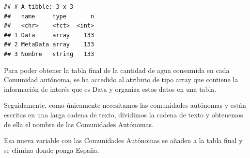 \documentclass[
]{article}
\newenvironment{Shaded}{\begin{snugshade}}{\end{snugshade}}
\newcommand{\ControlFlowTok}[1]{\textcolor[rgb]{0.13,0.29,0.53}{\textbf{#1}}}
\newcommand{\DecValTok}[1]{\textcolor[rgb]{0.00,0.00,0.81}{#1}}
\newcommand{\FunctionTok}[1]{\textcolor[rgb]{0.13,0.29,0.53}{\textbf{#1}}}
\newcommand{\NormalTok}[1]{#1}
\newcommand{\OtherTok}[1]{\textcolor[rgb]{0.56,0.35,0.01}{#1}}
\newcommand{\SpecialCharTok}[1]{\textcolor[rgb]{0.81,0.36,0.00}{\textbf{#1}}}
\newcommand{\StringTok}[1]{\textcolor[rgb]{0.31,0.60,0.02}{#1}}
\begin{document}
\begin{verbatim}
## # A tibble: 3 x 3
##   name     type       n
##   <chr>    <fct>  <int>
## 1 Data     array    133
## 2 MetaData array    133
## 3 Nombre   string   133
\end{verbatim}

Para poder obtener la tabla final de la cantidad de agua consumida en
cada Comunidad autónoma, se ha accedido al atributo de tipo array que
contiene la información de interés que es Data y organiza estos datos en
una tabla.

Seguidamente, como únicamente necesitamos las comunidades autónomas y
están escritas en una larga cadena de texto, dividimos la cadena de
texto y obtenemos de ella el nombre de las Comunidades Autónomas.

Esa nueva variable con las Comunidades Autónomas se añaden a la tabla
final y se elimina donde ponga España.

\begin{Shaded}
\end{Shaded}
\end{document}
